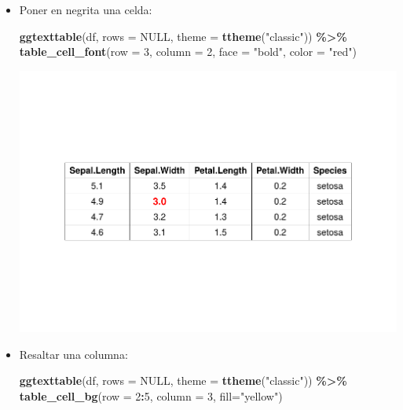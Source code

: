 \documentclass[
]{book}
\newenvironment{Shaded}{\begin{snugshade}}{\end{snugshade}}
\newcommand{\AttributeTok}[1]{\textcolor[rgb]{0.13,0.29,0.53}{#1}}
\newcommand{\ConstantTok}[1]{\textcolor[rgb]{0.56,0.35,0.01}{#1}}
\newcommand{\DecValTok}[1]{\textcolor[rgb]{0.00,0.00,0.81}{#1}}
\newcommand{\FunctionTok}[1]{\textcolor[rgb]{0.13,0.29,0.53}{\textbf{#1}}}
\newcommand{\NormalTok}[1]{#1}
\newcommand{\SpecialCharTok}[1]{\textcolor[rgb]{0.81,0.36,0.00}{\textbf{#1}}}
\newcommand{\StringTok}[1]{\textcolor[rgb]{0.31,0.60,0.02}{#1}}
\begin{document}
\begin{itemize}
\item
  Poner en negrita una celda:

\begin{Shaded}
\begin{Highlighting}[]
\FunctionTok{ggtexttable}\NormalTok{(df, }\AttributeTok{rows =} \ConstantTok{NULL}\NormalTok{,  }\AttributeTok{theme =} \FunctionTok{ttheme}\NormalTok{(}\StringTok{"classic"}\NormalTok{)) }\SpecialCharTok{\%\textgreater{}\%}  
  \FunctionTok{table\_cell\_font}\NormalTok{(}\AttributeTok{row =} \DecValTok{3}\NormalTok{, }\AttributeTok{column =} \DecValTok{2}\NormalTok{, }\AttributeTok{face =} \StringTok{"bold"}\NormalTok{, }\AttributeTok{color =} \StringTok{"red"}\NormalTok{)}
\end{Highlighting}
\end{Shaded}

  \includegraphics{R_Manual_files/figure-latex/unnamed-chunk-234-1.pdf}
\item
  Resaltar una columna:

\begin{Shaded}
\begin{Highlighting}[]
\FunctionTok{ggtexttable}\NormalTok{(df, }\AttributeTok{rows =} \ConstantTok{NULL}\NormalTok{,  }\AttributeTok{theme =} \FunctionTok{ttheme}\NormalTok{(}\StringTok{"classic"}\NormalTok{)) }\SpecialCharTok{\%\textgreater{}\%} 
  \FunctionTok{table\_cell\_bg}\NormalTok{(}\AttributeTok{row =} \DecValTok{2}\SpecialCharTok{:}\DecValTok{5}\NormalTok{, }\AttributeTok{column =} \DecValTok{3}\NormalTok{, }\AttributeTok{fill=}\StringTok{"yellow"}\NormalTok{)}
\end{Highlighting}
\end{Shaded}


\end{itemize}
\end{document}
